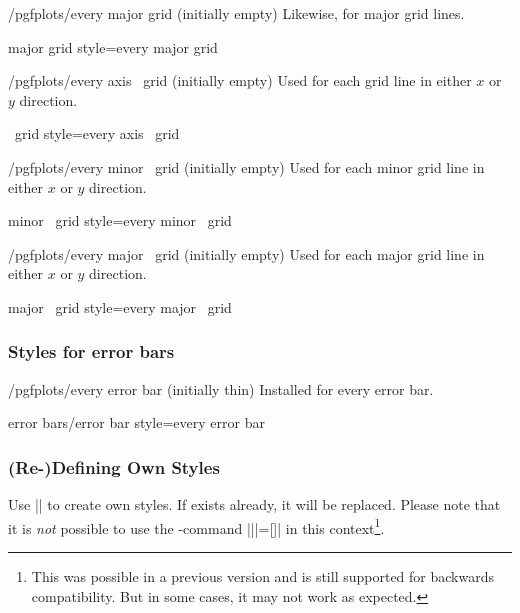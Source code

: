 \begin{stylekey}{/pgfplots/every major grid (initially empty)}
 Likewise, for major grid lines.
\end{stylekey}

\pgfplotsshortstylekey major grid style=every major grid\pgfeov

\begin{xystylekey}{/pgfplots/every axis \x\ grid (initially empty)}
	Used for each grid line in either $x$ or $y$ direction.
\end{xystylekey}

\pgfplotsshortxystylekey \x\ grid style=every axis \x\ grid\pgfeov

\begin{xystylekey}{/pgfplots/every minor \x\ grid (initially empty)}
	Used for each minor grid line in either $x$ or $y$ direction.
\end{xystylekey}

\pgfplotsshortxystylekey minor \x\ grid style=every minor \x\ grid\pgfeov

\begin{xystylekey}{/pgfplots/every major \x\ grid (initially empty)}
	Used for each major grid line in either $x$ or $y$ direction.
\end{xystylekey}

\pgfplotsshortxystylekey major \x\ grid style=every major \x\ grid\pgfeov

\subsubsection*{Styles for error bars}

\begin{stylekey}{/pgfplots/every error bar (initially thin)}
 Installed for every error bar. 
\end{stylekey}

\pgfplotsshortstylekey error bars/error bar style=every error bar\pgfeov

\subsubsection{(Re-)Defining Own Styles}
\label{sec:styles:own}%
Use ||
to create own styles. If  exists already, it will be replaced. Please note that it is \emph{not} possible to use the \Tikz-command |\tikzstyle||=[]| in this context\footnote{This was possible in a previous version and is still supported for backwards compatibility. But in some cases, it may not work as expected.}.
\begin{codeexample}[]

\end{codeexample}

